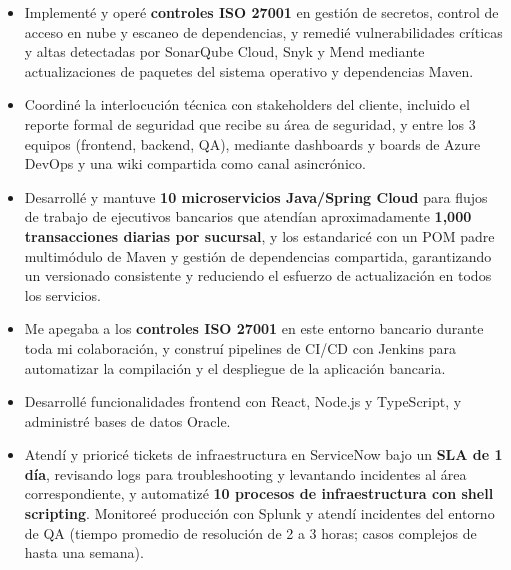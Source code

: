 {\begin{itemize}
    \item Implementé y operé \textbf{controles ISO 27001} en gestión de secretos, control de acceso en nube y escaneo de dependencias, y remedié vulnerabilidades críticas y altas detectadas por SonarQube Cloud, Snyk y Mend mediante actualizaciones de paquetes del sistema operativo y dependencias Maven.
    \item Coordiné la interlocución técnica con stakeholders del cliente, incluido el reporte formal de seguridad que recibe su área de seguridad, y entre los 3 equipos (frontend, backend, QA), mediante dashboards y boards de Azure DevOps y una wiki compartida como canal asincrónico.
\end{itemize}

\begin{itemize}
    \item Desarrollé y mantuve \textbf{10 microservicios Java/Spring Cloud} para flujos de trabajo de ejecutivos bancarios que atendían aproximadamente \textbf{1{,}000 transacciones diarias por sucursal}, y los estandaricé con un POM padre multimódulo de Maven y gestión de dependencias compartida, garantizando un versionado consistente y reduciendo el esfuerzo de actualización en todos los servicios.
    \item Me apegaba a los \textbf{controles ISO 27001} en este entorno bancario durante toda mi colaboración, y construí pipelines de CI/CD con Jenkins para automatizar la compilación y el despliegue de la aplicación bancaria.
    \item Desarrollé funcionalidades frontend con React, Node.js y TypeScript, y administré bases de datos Oracle.
    \item Atendí y prioricé tickets de infraestructura en ServiceNow bajo un \textbf{SLA de 1 día}, revisando logs para troubleshooting y levantando incidentes al área correspondiente, y automatizé \textbf{10 procesos de infraestructura con shell scripting}. Monitoreé producción con Splunk y atendí incidentes del entorno de QA (tiempo promedio de resolución de 2 a 3 horas; casos complejos de hasta una semana).
\end{itemize}

}
